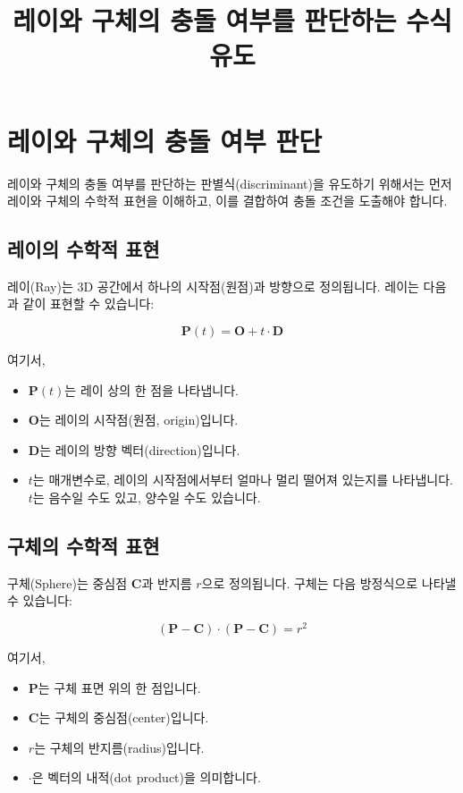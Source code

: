\documentclass[a4paper, 12pt]{article}
\title{레이와 구체의 충돌 여부를 판단하는 수식 유도}
\author{}
\date{}
\begin{document}
\maketitle

\section{레이와 구체의 충돌 여부 판단}

레이와 구체의 충돌 여부를 판단하는 판별식(discriminant)을 유도하기 위해서는 먼저 레이와 구체의 수학적 표현을 이해하고, 이를 결합하여 충돌 조건을 도출해야 합니다.

\subsection{레이의 수학적 표현}

레이(Ray)는 3D 공간에서 하나의 시작점(원점)과 방향으로 정의됩니다. 레이는 다음과 같이 표현할 수 있습니다:

\[
\mathbf{P}(t) = \mathbf{O} + t \cdot \mathbf{D}
\]

여기서,
\begin{itemize}
    \item \(\mathbf{P}(t)\)는 레이 상의 한 점을 나타냅니다.
    \item \(\mathbf{O}\)는 레이의 시작점(원점, origin)입니다.
    \item \(\mathbf{D}\)는 레이의 방향 벡터(direction)입니다.
    \item \(t\)는 매개변수로, 레이의 시작점에서부터 얼마나 멀리 떨어져 있는지를 나타냅니다. \(t\)는 음수일 수도 있고, 양수일 수도 있습니다.
\end{itemize}

\subsection{구체의 수학적 표현}

구체(Sphere)는 중심점 \(\mathbf{C}\)과 반지름 \(r\)으로 정의됩니다. 구체는 다음 방정식으로 나타낼 수 있습니다:

\[
(\mathbf{P} - \mathbf{C}) \cdot (\mathbf{P} - \mathbf{C}) = r^2
\]

여기서,
\begin{itemize}
    \item \(\mathbf{P}\)는 구체 표면 위의 한 점입니다.
    \item \(\mathbf{C}\)는 구체의 중심점(center)입니다.
    \item \(r\)는 구체의 반지름(radius)입니다.
    \item \(\cdot\)은 벡터의 내적(dot product)을 의미합니다.
\end{itemize}
\end{document}
